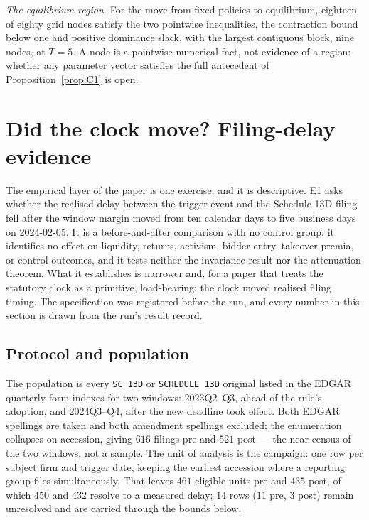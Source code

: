 \documentclass[11pt]{article}
\begin{document}
\emph{The equilibrium region.} For the move from fixed policies to equilibrium, eighteen of eighty
grid nodes satisfy the two pointwise inequalities, the contraction bound below one and positive
dominance slack, with the largest contiguous block, nine nodes, at $T = 5$. A node is a pointwise
numerical fact, not evidence of a region: whether any parameter vector satisfies the full
antecedent of Proposition~\ref{prop:C1} is open.

\section{Did the clock move? Filing-delay evidence}
\label{sec:empirics}

The empirical layer of the paper is one exercise, and it is descriptive. E1 asks whether the
realised delay between the trigger event and the Schedule 13D filing fell after the window
margin moved from ten calendar days to five business days on 2024-02-05. It is a
before-and-after comparison with no control group: it identifies no effect on liquidity,
returns, activism, bidder entry, takeover premia, or control outcomes, and it tests neither the
invariance result nor the attenuation theorem. What it establishes is narrower and, for a paper
that treats the statutory clock as a primitive, load-bearing: the clock moved realised filing
timing. The specification was registered before the run, and every number in this section is
drawn from the run's result record.

\subsection{Protocol and population}
\label{sec:e1protocol}

The population is every \texttt{SC 13D} or \texttt{SCHEDULE 13D} original listed in the EDGAR
quarterly form indexes for two windows: 2023Q2--Q3, ahead of the rule's adoption, and
2024Q3--Q4, after the new deadline took effect. Both EDGAR spellings are taken and both
amendment spellings excluded; the enumeration collapses on accession, giving $616$ filings pre
and $521$ post --- the near-census of the two windows, not a sample. The unit of analysis is the
campaign: one row per subject firm and trigger date, keeping the earliest accession where a
reporting group files simultaneously. That leaves $461$ eligible units pre and $435$ post, of
which $450$ and $432$ resolve to a measured delay; $14$ rows ($11$ pre, $3$ post) remain
unresolved and are carried through the bounds below.
\end{document}
